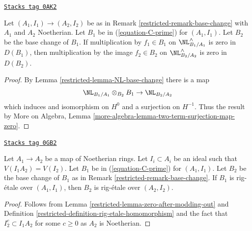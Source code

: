 \begin{lemma}
\label{restricted-lemma-zero-after-modding-out}
\href{https://stacks.math.columbia.edu/tag/0AK2}{\texttt{Stacks tag 0AK2}}

Let $(A_1, I_1) \to (A_2, I_2)$ be as in
Remark \ref{restricted-remark-base-change} with $A_1$ and $A_2$ Noetherian.
Let $B_1$ be in (\ref{equation-C-prime}) for $(A_1, I_1)$.
Let $B_2$ be the base change of $B_1$.
If multiplication by $f_1 \in B_1$ on $\NL^\wedge_{B_1/A_1}$
is zero in $D(B_1)$, then multiplication by
the image $f_2 \in B_2$ on $\NL^\wedge_{B_2/A_2}$ is zero
in $D(B_2)$.
\end{lemma}

\begin{proof}

By Lemma \ref{restricted-lemma-NL-base-change} there is a map
$$
\NL_{B_1/A_1} \otimes_{B_2} B_1 \to \NL_{B_2/A_2}
$$
which induces and isomorphism on $H^0$ and a surjection on $H^{-1}$.
Thus the result by
More on Algebra, Lemma \ref{more-algebra-lemma-two-term-surjection-map-zero}.
\end{proof}

\begin{lemma}
\label{restricted-lemma-base-change-rig-etale-homomorphism}
\href{https://stacks.math.columbia.edu/tag/0GB2}{\texttt{Stacks tag 0GB2}}

Let $A_1 \to A_2$ be a map of Noetherian rings. Let $I_i \subset A_i$
be an ideal such that $V(I_1A_2) = V(I_2)$. Let $B_1$ be in
(\ref{equation-C-prime}) for $(A_1, I_1)$.
Let $B_2$ be the base change of $B_1$ as in
Remark \ref{restricted-remark-base-change}.
If $B_1$ is rig-\'etale over $(A_1, I_1)$,
then $B_2$ is rig-\'etale over $(A_2, I_2)$.
\end{lemma}

\begin{proof}

Follows from Lemma \ref{restricted-lemma-zero-after-modding-out} and
Definition \ref{restricted-definition-rig-etale-homomorphism} and the fact
that $I_2^c \subset I_1A_2$ for some $c \geq 0$ as $A_2$ is Noetherian.
\end{proof}

